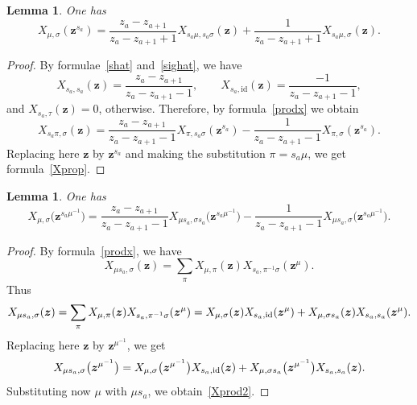 \documentclass[pdftex]{sigma}
\numberwithin{equation}{section}
\newtheorem{Lemma}[Theorem]{Lemma}
\newcommand{\id}{\mathrm{id}}
\begin{document}
\begin{Lemma}
One has
\begin{equation}\label{Xprop}
X_{\mu,\sigma}(\boldsymbol{z}^{s_a})=\frac{z_{a}-z_{a+1}}{z_{a}-z_{a+1}+1}X_{s_a\mu,s_a\sigma}(\boldsymbol{z} )+\frac{1}{z_{a}-z_{a+1}+1}X_{s_a\mu,\sigma}(\boldsymbol{z} ).
\end{equation}
\end{Lemma}
\begin{proof}By formulae~\eqref{shat} and~\eqref{sighat}, we have
\begin{equation*}
X_{s_a,s_a}(\boldsymbol{z})=\frac{z_a-z_{a+1}}{z_a-z_{a+1}-1}, \qquad X_{s_a,\id}(\boldsymbol{z})=\frac{-1}{z_a-z_{a+1}-1},
\end{equation*}
and $X_{s_a,\tau}(\boldsymbol{z})=0$, otherwise. Therefore, by formula~\eqref{prodx} we obtain
\begin{equation*}
X_{s_a\pi,\sigma}(\boldsymbol{z})=\frac{z_{a}-z_{a+1}}{z_{a}-z_{a+1}-1}X_{\pi,s_a\sigma}(\boldsymbol{z}^{s_a})-\frac{1}{z_a-z_{a+1}-1}X_{\pi,\sigma}(\boldsymbol{z}^{s_a}).
\end{equation*}
Replacing here $\boldsymbol{z}$ by $\boldsymbol{z}^{s_a}$ and making the substitution $\pi=s_a\mu$, we get formula~\eqref{Xprop}.
\end{proof}

\begin{Lemma} One has
\begin{equation}\label{Xprod2}
X_{\mu,\sigma }\bigl(\boldsymbol{z}^{s_a\mu^{-1}}\bigr)= \frac{z_{a}-z_{a+1}}{z_{a}-z_{a+1}-1} X_{\mu s_a,\sigma s_a} \bigl(\boldsymbol{z}^{s_a\mu^{-1}}\bigr)-\frac{1}{z_{a}-z_{a+1}-1}X_{\mu s_a,\sigma }\bigl(\boldsymbol{z}^{s_a\mu^{-1}}\bigr).
\end{equation}
\end{Lemma}
\begin{proof}
By formula~\eqref{prodx}, we have
\begin{equation*}
X_{\mu s_a,\sigma }(\boldsymbol{z})=\sum_{\pi} X_{\mu,\pi} (\boldsymbol{z})X_{s_a,\pi^{-1}\sigma } (\boldsymbol{z}^{\mu}).
\end{equation*}
Thus
\begin{equation*}
X_{\mu s_a,\sigma }(\boldsymbol{z})=\sum_{\pi} X_{\mu,\pi} (\boldsymbol{z})X_{s_a,\pi^{-1}\sigma } (\boldsymbol{z}^{\mu})=X_{\mu,\sigma } (\boldsymbol{z})X_{s_a, {\rm id}} (\boldsymbol{z}^{\mu})+X_{\mu,\sigma s_a} (\boldsymbol{z})X_{s_a, s_a} (\boldsymbol{z}^{\mu}).
\end{equation*}
Replacing here $\boldsymbol{z}$ by $\boldsymbol{z}^{\mu^{-1}}$, we get
\begin{equation*}
X_{\mu s_a,\sigma }\bigl(\boldsymbol{z}^{\mu^{-1}}\bigr)=X_{\mu,\sigma } \bigl(\boldsymbol{z}^{\mu^{-1}}\bigr)X_{s_a,{\rm id}} (\boldsymbol{z} )+X_{\mu,\sigma s_a} \bigl(\boldsymbol{z}^{\mu^{-1}}\bigr)X_{s_a, s_a} (\boldsymbol{z} ).
\end{equation*}
Substituting now $\mu$ with $\mu s_a$, we obtain~\eqref{Xprod2}.
\end{proof}
\end{document}
